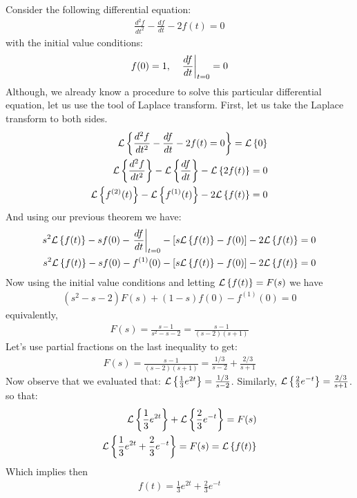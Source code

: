 \begin{mdframed}
	Consider the following differential equation:
	\begin{align*}
	\frac{d^2f}{dt^2} - \frac{df}{dt} - 2f(t) = 0
	\end{align*}
	with the initial value conditions:
	\begin{align*}
	f(0) = 1, \quad \left. \frac{df}{dt} \right|_{t = 0} = 0
	\end{align*}
	Although, we already know a procedure to solve this particular differential equation, let us use the tool of Laplace transform. First, let us take the Laplace transform to both sides.
	\begin{align*}
	\mathcal{L}\left\lbrace \frac{d^2f}{dt^2} - \frac{df}{dt} - 2f(t) = 0 \right\rbrace = \mathcal{L}\left\lbrace 0 \right\rbrace \\
	\mathcal{L}\left\lbrace \frac{d^2f}{dt^2} \right\rbrace - \mathcal{L}\left\lbrace \frac{df}{dt} \right\rbrace - \mathcal{L}\left\lbrace 2f(t) \right\rbrace = 0\\
	\mathcal{L}\left\lbrace f^{(2)}(t) \right\rbrace - \mathcal{L}\left\lbrace f^{(1)}(t) \right\rbrace -2\mathcal{L}\left\lbrace f(t) \right\rbrace  = 0
	\end{align*}
	And using our previous theorem we have:
	\begin{align*}
		s^2\mathcal{L}\left\lbrace f(t) \right\rbrace - sf(0) - \left. \frac{df}{dt} \right|_{t = 0} - \left[ s\mathcal{L}\left\lbrace f(t) \right\rbrace - f(0) \right] -2\mathcal{L}\left\lbrace f(t) \right\rbrace = 0 \\
		s^2\mathcal{L}\left\lbrace f(t) \right\rbrace - sf(0) - f^{(1)}(0) - \left[ s\mathcal{L}\left\lbrace f(t) \right\rbrace - f(0) \right] -2\mathcal{L}\left\lbrace f(t) \right\rbrace = 0 \\
	\end{align*}
	Now using the initial value conditions and letting $ \mathcal{L}\left\lbrace f(t) \right\rbrace = F(s) $ we have
	\begin{align*}
	\left( s^2 - s -2\right)F(s) + (1-s)f(0) - f^{(1)}(0) = 0
	\end{align*}
	equivalently,
	\begin{align*}
	F(s) = \frac{s-1}{s^2 - s -2} = \frac{s-1}{(s-2)(s+1)}
	\end{align*}
	Let's use partial fractions on the last inequality to get:
	\begin{align*}
	F(s) = \frac{s-1}{(s-2)(s+1)} = \frac{1/3}{s-2} + \frac{2/3}{s+1}
	\end{align*}
	Now observe that we evaluated that: $ \mathcal{L}\left\lbrace \frac{1}{3}e^{2t} \right\rbrace = \frac{1/3}{s-2} $. Similarly, $ \mathcal{L}\left\lbrace \frac{2}{3}e^{-t} \right\rbrace = \frac{2/3}{s+1}$. so that:
	\begin{align*}
	\mathcal{L}\left\lbrace \frac{1}{3}e^{2t} \right\rbrace + \mathcal{L}\left\lbrace \frac{2}{3}e^{-t} \right\rbrace = F(s) \\
	\mathcal{L}\left\lbrace  \frac{1}{3}e^{2t} + \frac{2}{3}e^{-t} \right\rbrace = F(s) = \mathcal{L}\left\lbrace f(t) \right\rbrace
	\end{align*}
	Which implies then
	\begin{align*}
	f(t) = \frac{1}{3}e^{2t} + \frac{2}{3}e^{-t}
	\end{align*}
\end{mdframed}
